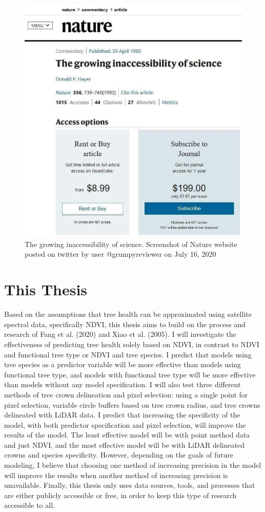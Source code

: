 \documentclass[12pt,twoside]{reedthesis}
\begin{document}
\begin{figure}

{\centering \includegraphics[width=0.75\linewidth]{figure/science_inaccessable} 

}

\caption[The growing inaccessibility of science]{The growing inaccessibility of science. Screenshot of Nature website posted on twitter by user @grumpyreviewer on July 16, 2020}\label{fig:twitter-pic}
\end{figure}
\hypertarget{this-thesis}{%
\section{This Thesis}\label{this-thesis}}

Based on the assumptions that tree health can be approximated using
satellite spectral data, specifically NDVI, this thesis aims to build on
the process and research of Fang et al. (2020) and Xiao et al. (2005). I will investigate
the effectiveness of predicting tree health solely based on NDVI, in
contrast to NDVI and functional tree type or NDVI and tree species. I
predict that models using tree species as a predictor variable will be
more effective than models using functional tree type, and models with
functional tree type will be more effective than models without any
model specification. I will also test three different methods of tree
crown delineation and pixel selection: using a single point for pixel
selection, variable circle buffers based on tree crown radius, and tree
crowns delineated with LiDAR data. I predict that increasing the
specificity of the model, with both predictor specification and pixel
selection, will improve the results of the model. The least effective
model will be with point method data and just NDVI, and the most
effective model will be with LiDAR delineated crowns and species
specificity. However, depending on the goals of future modeling, I
believe that choosing one method of increasing precision in the model
will improve the results when another method of increasing precision is
unavailable. Finally, this thesis only uses data sources, tools, and
processes that are either publicly accessible or free, in order to keep
this type of research accessible to all.
\end{document}
